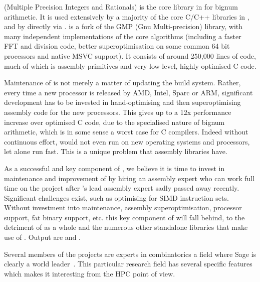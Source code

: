 \begin{workpackage}
\begin{tasklist}
\begin{task}[title=\MPIR,id=hpc-mpir, lead=UK,PM=12]
\MPIR (Multiple Precision Integers and Rationals) is the core library in \Sage
for bignum arithmetic. It is used extensively by a majority of the core C/C++
libraries in \Sage, and by \Sage directly via \Cython. \MPIR is a fork of the 
GMP (Gnu Multi-precision) library, with many independent implementations of the
core algorithms (including a faster FFT and division code, better 
superoptimisation on some common 64 bit processors and native MSVC support). 
It consists of around 250,000 lines of code, much of which is assembly 
primitives and very low level, highly optimised C code.

Maintenance of \MPIR is not merely a matter of updating the build system.
Rather, every time a new processor is released by AMD, Intel, Sparc or ARM,
significant development has to be invested in hand-optimising and then
superoptimising assembly code for the new processors. This gives up to a 12x
performance increase over optimised C code, due to the specialised nature of
bignum arithmetic, which is in some sense a worst case for C compilers. Indeed
without continuous effort, \MPIR would not even run on new operating systems and
processors, let alone run fast. This is a unique problem that assembly libraries
have.

As a successful and key component of \Sage, we believe it is time to invest in
maintenance and improvement of \MPIR by hiring an assembly expert who can work
full time on the project after \MPIR's lead assembly expert sadly passed
away recently. Significant challenges exist, such as
optimising for SIMD instruction sets. Without investment into maintenance,
assembly superoptimisation, processor support, fat binary support, etc. this key
component of \Sage will fall behind, to the detriment of \Sage as a whole and the
numerous other standalone libraries that make use of \MPIR.
Output are  and . 
\end{task}

\begin{task}[title=HPC infrastructure for combinatorics,id=hpc-combi,PM=26,lead=PS,partners={UB}]

  Several members of the projects are experts in combinatorics a field where
  Sage is clearly a world leader~\cite{Sage-Combinat}. This particular research
  field has several specific features which makes it interesting from the HPC
  point of view.


\end{task}
\end{tasklist}
\end{workpackage}

